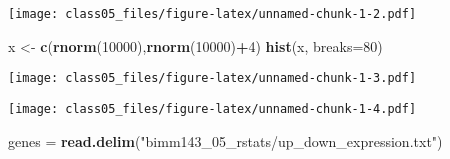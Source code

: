 \documentclass[]{article}
\newenvironment{Shaded}{\begin{snugshade}}{\end{snugshade}}
\newcommand{\DataTypeTok}[1]{\textcolor[rgb]{0.13,0.29,0.53}{#1}}
\newcommand{\DecValTok}[1]{\textcolor[rgb]{0.00,0.00,0.81}{#1}}
\newcommand{\KeywordTok}[1]{\textcolor[rgb]{0.13,0.29,0.53}{\textbf{#1}}}
\newcommand{\NormalTok}[1]{#1}
\newcommand{\OperatorTok}[1]{\textcolor[rgb]{0.81,0.36,0.00}{\textbf{#1}}}
\newcommand{\StringTok}[1]{\textcolor[rgb]{0.31,0.60,0.02}{#1}}
\begin{document}
\texttt{[image: class05\_files/figure-latex/unnamed-chunk-1-2.pdf]}

\begin{Shaded}
\begin{Highlighting}[]
\NormalTok{x <-}\StringTok{ }\KeywordTok{c}\NormalTok{(}\KeywordTok{rnorm}\NormalTok{(}\DecValTok{10000}\NormalTok{),}\KeywordTok{rnorm}\NormalTok{(}\DecValTok{10000}\NormalTok{)}\OperatorTok{+}\DecValTok{4}\NormalTok{)}
\KeywordTok{hist}\NormalTok{(x, }\DataTypeTok{breaks=}\DecValTok{80}\NormalTok{)}
\end{Highlighting}
\end{Shaded}

\texttt{[image: class05\_files/figure-latex/unnamed-chunk-1-3.pdf]}

\begin{Shaded}
\end{Shaded}

\texttt{[image: class05\_files/figure-latex/unnamed-chunk-1-4.pdf]}

\begin{Shaded}
\begin{Highlighting}[]
\NormalTok{genes =}\StringTok{ }\KeywordTok{read.delim}\NormalTok{(}\StringTok{"bimm143_05_rstats/up_down_expression.txt"}\NormalTok{)}
\end{Highlighting}
\end{Shaded}
\end{document}
